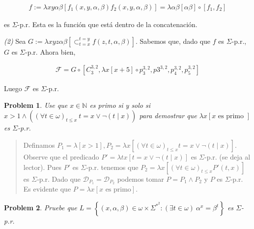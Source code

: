 \documentclass[a4paper, 12pt]{article}
\newtheorem{problem}{Problem}
\newtheorem{problem}{Problem}
\begin{document}
\begin{align*}
    f := \lambda xy\alpha\beta \left[ f_1(x, y, \alpha, \beta) f_2(x, y, \alpha,
    \beta)  \right] = \lambda \alpha \beta \left[ \alpha\beta  \right] \circ
    \left[ f_1, f_2 \right] 
\end{align*}

es $\Sigma$-p.r. Esta es la función que está dentro de la concatenación. 

\textit{(2)} Sea $G := \lambda xyz\alpha\beta \left[
\mathop{\subset}_{t=x}^{t=y} f(z, t, \alpha, \beta)  \right]$. Sabemos que, dado
que $f$ es $\Sigma$-p.r., $G$ es $\Sigma$-p.r. Ahora bien, 

\begin{align*}
\mathcal{F} = G \circ \left[ C_3^{3, 2}, \lambda x \left[ x + 5  \right] \circ
p_3^{3, 2}, p3^{3, 2}, p_4^{3, 2}, p_5^{3, 2} \right] 
\end{align*}

Luego $\mathcal{F}$ es $\Sigma$-p.r. 

\begin{problem}
    Use que $x \in \mathbb{N}$ es primo si y solo si $x > 1 \land \left(
    (\forall t \in \omega)_{t \leq x} ~ t = x \lor \neg(t \mid x) \right) $ para
    demostrar que $\lambda x \left[ x \text{ es primo }  \right]$ es $\Sigma$-p.r. 
\end{problem}


\small
\begin{quote}

Definamos $P_1 = \lambda  \left[  x > 1 \right], P_2 = \lambda x \left[ \left( \forall t
\in \omega \right)_{t\leq x} t = x \lor \neg \left( t \mid x \right)
\right]$. Observe que el predicado $P' = \lambda tx \left[  t = x \lor \neg (t \mid
x) \right]$ es $\Sigma$-p.r. (se deja al lector). Pues $P'$ es $\Sigma$-p.r.
tenemos que $P_2 = \lambda x \left[ (\forall t \in \omega)_{t \leq x} P'(t, x)
\right]$ es $\Sigma$-p.r. Dado que $\mathcal{D}_{P_1} = \mathcal{D}_{P_2}$
podemos tomar $P = P_1 \land P_2$ y $P$ es $\Sigma$-p.r. Es evidente que $P =
\lambda x \left[  x \text{ es primo} \right] $.

\end{quote}
\normalsize
\pagebreak

\begin{problem}
    Pruebe que $ L = \left\{ (x, \alpha, \beta) \in \omega \times \Sigma^{*}^2 : \left(
    \exists t \in \omega \right) ~ \alpha^x = \beta^t  \right\} $ es $\Sigma$-p.r. 
\end{problem}
\end{document}
